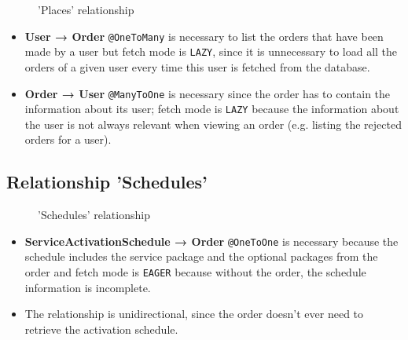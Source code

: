 \begin{minipage}[h]{0.5\textwidth}
    \begin{figure}[H]
        
        \caption{'Places' relationship}
        \label{fig:orm_u_o}
    \end{figure}
\end{minipage}
\hfill
\begin{minipage}[h]{0.48\textwidth}
    \begin{itemize}
        \item \textbf{User → Order} \texttt{@OneToMany} is necessary to list the orders that have been made by a user but fetch mode is \texttt{LAZY}, since it is unnecessary to load all the orders of a given user every time this user is fetched from the database.
        \item \textbf{Order → User} \texttt{@ManyToOne} is necessary since the order has to contain the information about its user; fetch mode is \texttt{LAZY} because the information about the user is not always relevant when viewing an order (e.g. listing the rejected orders for a user).
    \end{itemize}
\end{minipage}

\subsection*{Relationship 'Schedules'}

\begin{minipage}[h]{0.5\textwidth}
    \begin{figure}[H]
        
        \caption{'Schedules' relationship}
        \label{fig:orm_sac_o}
    \end{figure}
\end{minipage}
\hfill
\begin{minipage}[h]{0.48\textwidth}
    \begin{itemize}
        \item \textbf{ServiceActivationSchedule → Order} \texttt{@OneToOne} is necessary because the schedule includes the service package and the optional packages from the order and fetch mode is \texttt{EAGER} because without the order, the schedule information is incomplete.
        \item The relationship is unidirectional, since the order doesn’t ever need to retrieve the activation schedule.
    \end{itemize}
\end{minipage}

